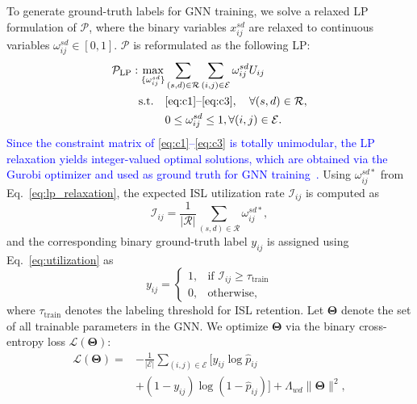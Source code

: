 To generate ground-truth labels for GNN training, we solve a relaxed LP formulation of $\mathcal{P}$, where the binary variables $x_{ij}^{sd}$ are relaxed to continuous variables $\omega_{ij}^{sd} \in [0, 1]$. $\mathcal{P}$ is reformulated as the following LP:
\begin{equation} \label{eq:lp_relaxation}
\begin{aligned}
\mathcal{P}_{\text{LP}}: \max_{\{\omega_{ij}^{sd}\}} & \sum_{(s,d) \in \mathcal{R}} \sum_{(i,j) \in \mathcal{E}} \omega_{ij}^{sd} U_{ij} \\
\text{s.t.} \quad & \eqref{eq:c1} \text{--} \eqref{eq:c3}, \quad \forall (s,d) \in \mathcal{R}, \\
& 0 \leq \omega_{ij}^{sd} \leq 1, \forall (i,j) \in \mathcal{E}.
\end{aligned}
\end{equation}
\textcolor{blue}{Since the constraint matrix of \eqref{eq:c1}--\eqref{eq:c3} is totally unimodular, the LP relaxation yields integer-valued optimal solutions, which are obtained via the Gurobi optimizer and used as ground truth for GNN training~\cite{zhao2022link}.} Using $\omega_{ij}^{sd*}$ from Eq.~\eqref{eq:lp_relaxation}, the expected ISL utilization rate $\mathcal{I}_{ij}$ is computed as
\begin{equation} \label{eq:utilization}
    \mathcal{I}_{ij} = \frac{1}{|\mathcal{R}|} \sum_{(s,d)\in\mathcal{R}} \omega_{ij}^{sd*},
\end{equation}
and the corresponding binary ground-truth label $y_{ij}$ is assigned using Eq.~\eqref{eq:utilization} as
\begin{equation} \label{eq:label}
    y_{ij} = \begin{cases} 1, & \text{if } \mathcal{I}_{ij} \geq \tau_{\text{train}} \\ 0, & \text{otherwise,} \end{cases}
\end{equation}
where $\tau_{\text{train}}$ denotes the labeling threshold for ISL retention.
Let $\boldsymbol{\Theta}$ denote the set of all trainable parameters in the GNN. We optimize $\boldsymbol{\Theta}$ via the binary cross-entropy loss $\mathcal{L}(\boldsymbol{\Theta})$:
\begin{equation} \label{eq:loss_function}
\begin{aligned}
    \mathcal{L}(\boldsymbol{\Theta}) = &-\frac{1}{|\mathcal{E}|} \sum_{(i,j) \in \mathcal{E}} \Big[ y_{ij} \log \hat{p}_{ij} \\
    &+ (1 - y_{ij}) \log (1 - \hat{p}_{ij}) \Big] + \Lambda_{wd} \|\boldsymbol{\Theta}\|^2,
\end{aligned}
\end{equation}
